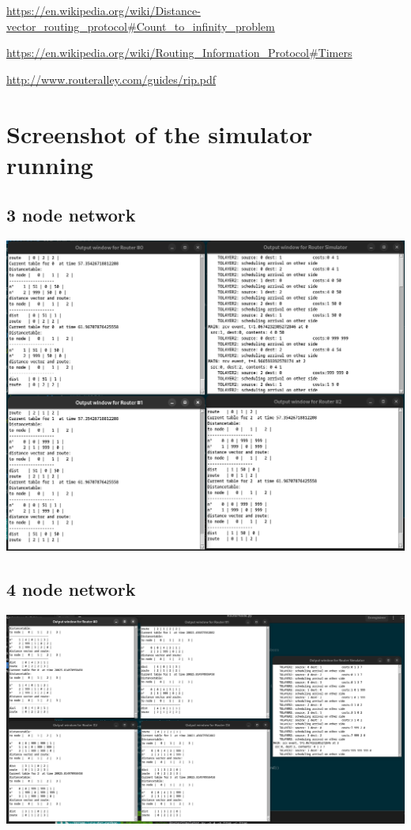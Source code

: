 \documentclass[a4paper,11pt,final]{report}
\begin{document}
\url{https://en.wikipedia.org/wiki/Distance-vector\_routing\_protocol\#Count\_to\_infinity\_problem}

\url{https://en.wikipedia.org/wiki/Routing\_Information\_Protocol\#Timers}

\url{http://www.routeralley.com/guides/rip.pdf}

\chapter{Screenshot of the simulator running}

\section{3 node network}

\includegraphics[width=\linewidth]{upload_f79f336d7f2818a70e34477d37d6e236.png}

\section{4 node network}

\includegraphics[width=\linewidth]{upload_9c613d09dbd091ad941cf9237feb2efd.png}
\end{document}
